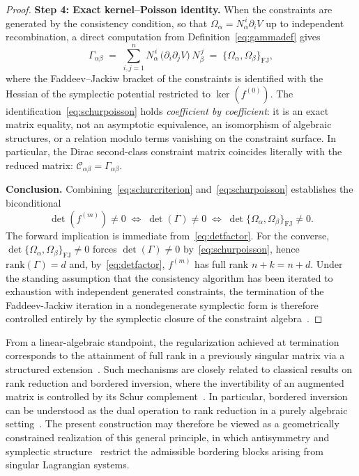 \documentclass[11pt,a4paper]{article}
\begin{document}
\begin{proof}
		\smallskip
		\textbf{Step 4: Exact kernel--Poisson identity.}
		When the constraints are generated by the consistency condition, so that $\Omega_\alpha = N_\alpha^{\,i}\partial_i V$ up to independent recombination, a direct computation from Definition~\eqref{eq:gammadef} gives
		\begin{equation}\label{eq:schurpoisson}
			\Gamma_{\alpha\beta} \;=\; \sum_{i,j=1}^{n} N_\alpha^{\,i}\,\bigl(\partial_i\partial_j V\bigr)\,N_\beta^{\,j} \;=\; \{\Omega_\alpha,\Omega_\beta\}_{\mathrm{FJ}},
		\end{equation}
		where the Faddeev--Jackiw bracket of the constraints is identified with the Hessian of the symplectic potential restricted to $\ker(f^{(0)})$. The identification~\eqref{eq:schurpoisson} holds \emph{coefficient by coefficient}: it is an exact matrix equality, not an asymptotic equivalence, an isomorphism of algebraic structures, or a relation modulo terms vanishing on the constraint surface. In particular, the Dirac second-class constraint matrix coincides literally with the reduced matrix: $\mathcal{C}_{\alpha\beta} = \Gamma_{\alpha\beta}$.
		
		\smallskip
		\textbf{Conclusion.} Combining~\eqref{eq:schurcriterion} and~\eqref{eq:schurpoisson} establishes the biconditional
		\[
		\det(f^{(m)}) \neq 0 \;\iff\; \det(\Gamma) \neq 0 \;\iff\; \det\{\Omega_\alpha,\Omega_\beta\}_{\mathrm{FJ}} \neq 0.
		\]
		The forward implication is immediate from~\eqref{eq:detfactor}. For the converse, $\det\{\Omega_\alpha,\Omega_\beta\}_{\mathrm{FJ}}\neq 0$ forces $\det(\Gamma)\neq 0$ by~\eqref{eq:schurpoisson}, hence $\mathrm{rank}(\Gamma)=d$ and, by~\eqref{eq:detfactor}, $f^{(m)}$ has full rank $n+k=n+d$. Under the standing assumption that the consistency algorithm has been iterated to exhaustion with independent generated constraints, the termination of the Faddeev-Jackiw iteration in a nondegenerate symplectic form is therefore controlled entirely by the symplectic closure of the constraint algebra~\cite{Gotay1978,Crnkovic1987,Dirac1964,GitmanTyutin1990}.
	\end{proof}
	
	From a linear-algebraic standpoint, the regularization achieved at termination corresponds to the attainment of full rank in a previously singular matrix via a structured extension~\cite{Galantai2001,HornJohnson2013}. Such mechanisms are closely related to classical results on rank reduction and bordered inversion, where the invertibility of an augmented matrix is controlled by its Schur complement~\cite{Zhang2005,Cottle2009}. In particular, bordered inversion can be understood as the dual operation to rank reduction in a purely algebraic setting~\cite{Galantai2001}. The present construction may therefore be viewed as a geometrically constrained realization of this general principle, in which antisymmetry and symplectic structure~\cite{ArnoldBook,Marsden1999} restrict the admissible bordering blocks arising from singular Lagrangian systems.
	
\end{document}

